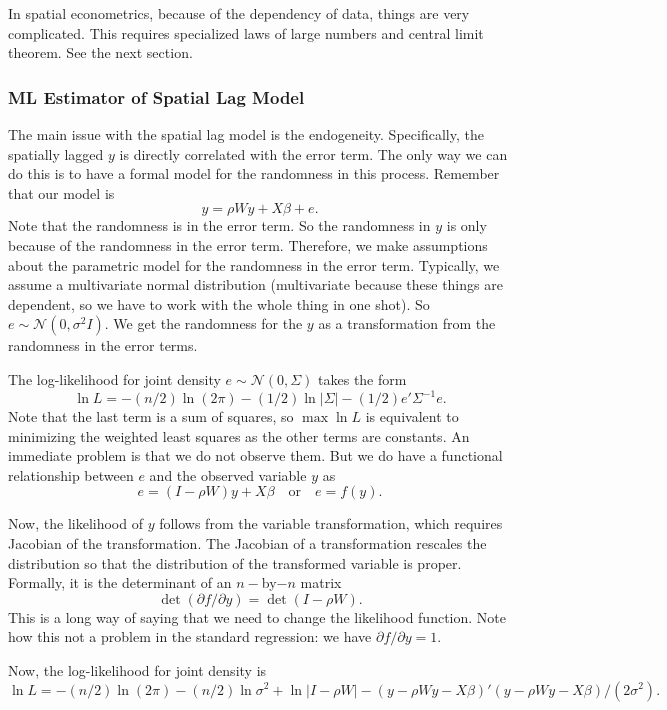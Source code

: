 \documentclass[11pt,a4paper]{amsart}
\theoremstyle{plain}
\theoremstyle{definition}
\begin{document}
In spatial econometrics, because of the dependency of data, things are very complicated. This requires specialized laws of large numbers and central limit theorem. See the next section.

\subsubsection{ML Estimator of Spatial Lag Model}\hfill\par 
The main issue with the spatial lag model is the endogeneity. Specifically, the spatially lagged $y$ is directly correlated with the error term. The only way we can do this is to have a formal model for the randomness in this process. Remember that our model is 
\[	y = \rho Wy + X\beta + e.	\]
Note that the randomness is in the error term. So the randomness in $y$ is only because of the randomness in the error term. Therefore, we make assumptions about the parametric model for the randomness in the error term. Typically, we assume a multivariate normal distribution (multivariate because these things are dependent, so we have to work with the whole thing in one shot). So $e \sim \mathscr{N}(0, \sigma^{2}I)$. We get the randomness for the $y$ as a transformation from the randomness in the error terms. 

The log-likelihood for joint density $e \sim \mathscr{N}(0, \Sigma)$ takes the form
\begin{equation}\label{log-likelihood}
	\ln L = -(n/2) \ln(2\pi) - (1/2) \ln |\Sigma| - (1/2) e'\Sigma^{-1}e.
\end{equation}
Note that the last term is a sum of squares, so $\max \ln L$ is equivalent to minimizing the weighted least squares as the other terms are constants. An immediate problem is that we do not observe them. But we do have a functional relationship between $e$ and the observed variable $y$ as 
\[	e = (I - \rho W)y + X \beta \quad \text{or} \quad e = f(y).	\]

Now, the likelihood of $y$ follows from the variable transformation, which requires Jacobian of the transformation.  The Jacobian of a transformation rescales the distribution so that the distribution of the transformed variable is proper. Formally, it is the determinant of an $n-$by$-n$ matrix
\[	\det (\partial f/\partial y) = \det (I - \rho W).	\]
This is a long way of saying that we need to change the likelihood function. Note how this not a problem in the standard regression: we have $\partial f/\partial y = 1$. 

Now, the  log-likelihood for joint density is 
\[	\ln L = -(n/2) \ln(2\pi) -(n/2)\ln \sigma^{2} + \ln |I-\rho W| - (y - \rho Wy - X \beta)'(y - \rho Wy - X \beta)/(2\sigma^{2}).	\]
\end{document}
